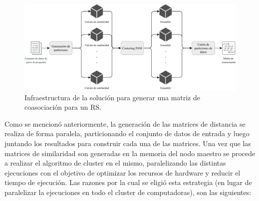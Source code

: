 \begin{figure}[h!]
	\centering
	\includegraphics[width=1\linewidth]{8_problema_investigacion/imagenes/equal_distribuido}
	\caption{Infraestructura de la solución para generar una matriz de coasociación para un RS.}
	\label{fig:equaldistribuido}
\end{figure}

\bigskip Como se mencionó anteriormente, la generación de las matrices de distancia se realiza de forma paralela, particionando el conjunto de datos de entrada y luego juntando los resultados para construir cada una de las matrices. Una vez que las matrices de similaridad son generadas en la memoria del nodo maestro se procede a realizar el algoritmo de cluster en el mismo, paralelizando las distintas ejecuciones con el objetivo de optimizar los recursos de hardware y reducir el tiempo de ejecución. Las razones por la cual se eligió esta estrategia (en lugar de paralelizar la ejecuciones en todo el cluster de computadoras), son las siguientes:

